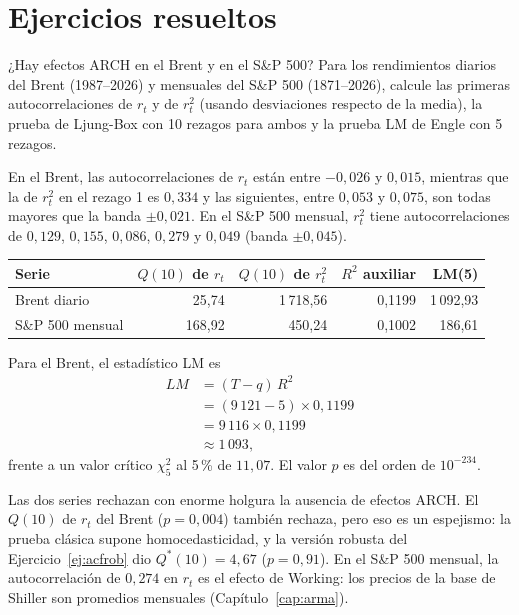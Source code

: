 \section{Ejercicios resueltos}

\begin{ejresuelto}{¿Hay efectos ARCH en el Brent y en el S\&P 500?}\label{ej:archlm}
\enunciado Para los rendimientos diarios del Brent (1987--2026) y mensuales del S\&P 500 (1871--2026), calcule
las primeras autocorrelaciones de $r_t$ y de $r_t^2$ (usando desviaciones respecto de la media), la prueba de
Ljung-Box con 10 rezagos para ambos y la prueba LM de Engle con 5 rezagos.

\solucion
{} En el Brent, las autocorrelaciones de $r_t$ están entre $-0{,}026$ y
$0{,}015$, mientras que la de $r_t^2$ en el rezago 1 es $0{,}334$ y las siguientes, entre $0{,}053$ y $0{,}075$,
son todas mayores que la banda $\pm0{,}021$. En el S\&P 500 mensual, $r_t^2$ tiene autocorrelaciones de
$0{,}129$, $0{,}155$, $0{,}086$, $0{,}279$ y $0{,}049$ (banda $\pm0{,}045$).

\begin{center}\small
\begin{tabular}{@{}lrrrr@{}}
\toprule
Serie & $Q(10)$ de $r_t$ & $Q(10)$ de $r_t^2$ & $R^2$ auxiliar & LM(5) \\
\midrule
Brent diario      & 25,74 & 1\,718,56 & 0,1199 & 1\,092,93 \\
S\&P 500 mensual  & 168,92 & 450,24 & 0,1002 & 186,61 \\
\bottomrule
\end{tabular}
\end{center}
Para el Brent, el estadístico LM es
\begin{align*}
  LM &= (T-q)\,R^2\\
     &= (9\,121-5)\times0{,}1199\\
     &= 9\,116\times0{,}1199\\
     &\approx 1\,093,
\end{align*}
frente a un valor crítico $\chi^2_5$ al 5\,\% de $11{,}07$. El valor $p$ es del orden de $10^{-234}$.

 Las dos series rechazan con enorme holgura la ausencia de efectos ARCH. El
$Q(10)$ de $r_t$ del Brent ($p=0{,}004$) también rechaza, pero eso es un espejismo: la prueba clásica supone
homocedasticidad, y la versión robusta del Ejercicio~\ref{ej:acfrob} dio $Q^*(10)=4{,}67$ ($p=0{,}91$). En el
S\&P 500 mensual, la autocorrelación de $0{,}274$ en $r_t$ es el efecto de Working: los precios de la base de
Shiller son promedios mensuales (Capítulo~\ref{cap:arma}).


\end{ejresuelto}
